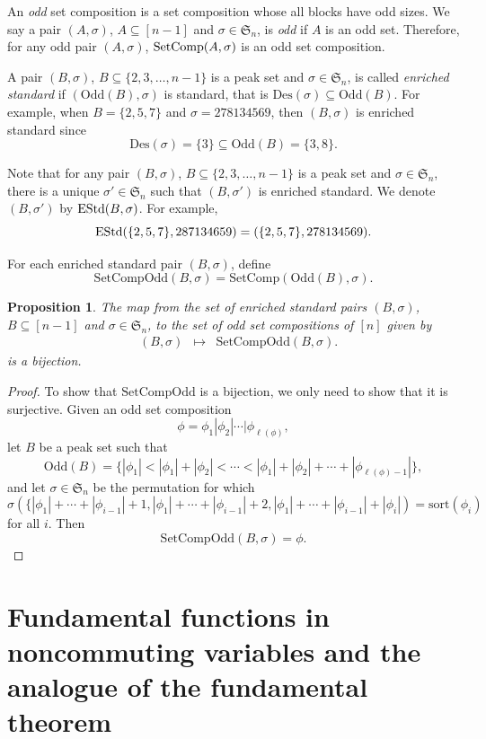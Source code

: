 \documentclass[11pt]{amsart}
\newtheorem{Proposition}[Theorem]{Proposition}
\numberwithin{equation}{section}
\newcommand{\SetComp}{\mathrm{SetComp}}
\newcommand{\OddSetComp}{\mathrm{SetCompOdd}}
\newcommand{\odd}{\mathrm{Odd}}
\newcommand{\Des}{\mathrm{Des}}
\newcommand{\frakS}{{\mathfrak{S}}}
\newcommand{\sort}{{\mathrm{sort}}}
\begin{document}
An \emph{odd} set composition is a set composition whose all blocks have odd sizes. We say a pair $(A,\sigma)$, $A\subseteq[n-1]$ and $\sigma\in \mathfrak{S}_n$, is \emph{odd} if $A$ is an odd set. Therefore, for any odd pair $(A,\sigma)$, ${\rm SetComp}(A,\sigma)$ is an odd set composition. 


A pair $(B,\sigma)$, $B\subseteq \{2,3,\dots, n-1\}$ is a peak set and $\sigma\in \frakS_n$,  is called \emph{enriched standard} if $(\odd(B),\sigma)$ is standard, that is $\Des(\sigma)\subseteq \odd(B)$. 
For example, when  $B=\{2,5,7\}$ and $\sigma = 278134569$, then $(B,\sigma)$ is enriched standard since 
$$\Des(\sigma)=\{3\}\subseteq \odd(B)=\{3,8\}.$$

Note that for any pair $(B,\sigma)$,  $B\subseteq \{2,3,\dots, n-1\}$ is a peak set and $\sigma\in \frakS_n$, there is a unique $\sigma'\in\mathfrak{S}_n$ such that $(B,\sigma')$ is enriched standard. We denote $(B,\sigma')$ by ${\rm EStd}(B,\sigma)$.   For example, 
\[{\rm EStd}(\{2,5,7\},287134659)=(\{2,5,7\},278134569).\]

For each enriched standard pair $(B,\sigma)$, define 
\[ \OddSetComp(B,\sigma)=\SetComp(\odd(B),\sigma). \]


\begin{Proposition}\label{Prop:OddSetComp}
The map from the set of enriched standard pairs $(B,\sigma)$, $B\subseteq[n-1]$ and $\sigma\in\mathfrak{S}_n$, to the set of odd set compositions of $[n]$ given by 
\[
\begin{array}{cccc}
& (B,\sigma) & \mapsto & \OddSetComp(B,\sigma).
\end{array} 
\]
is a bijection.
\end{Proposition} 
\begin{proof}
To show that $\OddSetComp$ is a bijection, we only need to show that it is surjective. Given an odd set composition 
$$\phi=\phi_1|\phi_2|\cdots|\phi_{\ell(\phi)},$$ 
let $B$ be a peak set such that 
$$\odd(B)=\{ |\phi_1|< |\phi_1|+ |\phi_2|< \cdots<|\phi_1|+|\phi_2|+\cdots+|\phi_{\ell(\phi)-1}| \},$$ and let $\sigma\in\mathfrak{S}_n$ be the permutation for which
$$ \sigma(\{|\phi_{1}|+ \cdots+|\phi_{i-1}|+1,|\phi_{1}|+ \cdots+|\phi_{i-1}|+2, |\phi_{1}|+ \cdots+|\phi_{i-1}|+|\phi_{i}| )=\sort(\phi_i)$$ for all $i$. Then 
$$\OddSetComp(B,\sigma)=\phi.$$
\end{proof} 




\section{Fundamental functions in noncommuting variables and the analogue of the fundamental theorem}\label{Sec:fundamental}
\end{document}
